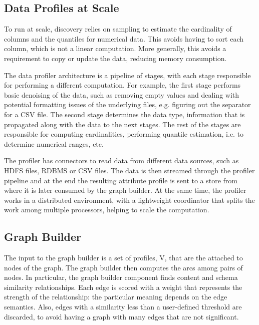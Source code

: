 \subsection{Data Profiles at Scale}

To run at scale, discovery relies on sampling to estimate the cardinality of columns and the quantiles for numerical data. This avoids having to sort each column, which is not a linear computation.  More generally, this avoids a requirement to copy or update the data, reducing memory consumption. 

The data profiler architecture is a pipeline of stages, with each stage responsible for performing a different computation. For example, the first stage performs basic denoising of the data, such as removing empty values and dealing with potential formatting issues of the underlying files, e.g. figuring out the separator for a CSV file. The second stage determines the data type, information that is propagated along with the data to the next stages. The rest of the stages are responsible for computing cardinalities, performing quantile estimation, i.e. to determine numerical ranges, etc. 

The profiler has connectors to read data from different data sources, such as HDFS files, RDBMS or CSV files. The data is then streamed through the profiler pipeline and at the end the resulting attribute profile is sent to a store from where it is later consumed by the graph builder. At the same time, the profiler works in a distributed environment, with a lightweight coordinator that splits the work among multiple processors, helping to scale the computation.



\subsection{Graph Builder} 



The input to the graph builder is a set of profiles, V, that are the attached to nodes of the graph. The graph builder then computes the arcs among pairs of nodes. In particular, the graph builder component finds content and schema similarity relationships. Each edge is scored with a weight that represents the strength of the relationship: the particular meaning depends on the edge semantics.  Also, edges with a similarity less than a user-defined threshold are discarded, to avoid having a graph with many edges that are not significant. 


